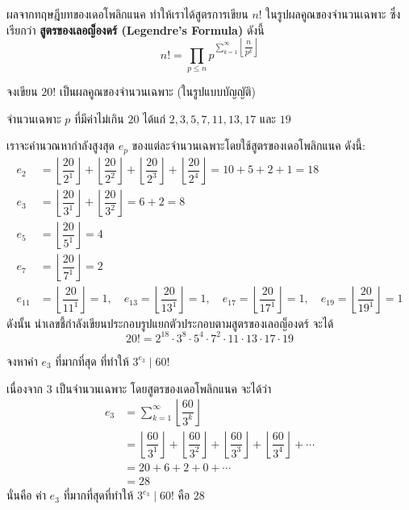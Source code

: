 \begin{remarkbox}
	ผลจากทฤษฎีบทของเดอโพลิกแนค ทำให้เราได้สูตรการเขียน $n!$ ในรูปผลคูณของจำนวนเฉพาะ ซึ่งเรียกว่า \textbf{สูตรของเลอญ็องดร์ (Legendre's Formula)} ดังนี้
\[ n! = \displaystyle\prod_{p \leq n} p^{\displaystyle\sum_{k=1}^{\infty} \left\lfloor \dfrac{n}{p^k} \right\rfloor} \]
\end{remarkbox}

\begin{examplebox}
	จงเขียน $20!$ เป็นผลคูณของจำนวนเฉพาะ (ในรูปแบบบัญญัติ) 
\end{examplebox}
	\solution จำนวนเฉพาะ $p$ ที่มีค่าไม่เกิน $20$ ได้แก่ $2, 3, 5, 7, 11, 13, 17$ และ $19$ 
	
เราจะคำนวณหากำลังสูงสุด $e_p$ ของแต่ละจำนวนเฉพาะโดยใช้สูตรของเดอโพลิกแนค ดังนี้:
\begin{align*}
	e_2 &= \left\lfloor \dfrac{20}{2^1} \right\rfloor + \left\lfloor \dfrac{20}{2^2} \right\rfloor + \left\lfloor \dfrac{20}{2^3} \right\rfloor + \left\lfloor \dfrac{20}{2^4} \right\rfloor = 10 + 5 + 2 + 1 = 18 \\
	e_3 &= \left\lfloor \dfrac{20}{3^1} \right\rfloor + \left\lfloor \dfrac{20}{3^2} \right\rfloor = 6 + 2 = 8 \\
	e_5 &= \left\lfloor \dfrac{20}{5^1} \right\rfloor = 4 \\
	e_7 &= \left\lfloor \dfrac{20}{7^1} \right\rfloor = 2 \\
	e_{11} &= \left\lfloor \dfrac{20}{11^1} \right\rfloor = 1, \quad e_{13} = \left\lfloor \dfrac{20}{13^1} \right\rfloor = 1, \quad e_{17} = \left\lfloor \dfrac{20}{17^1} \right\rfloor = 1, \quad e_{19} = \left\lfloor \dfrac{20}{19^1} \right\rfloor = 1
\end{align*}
ดังนั้น นำเลขชี้กำลังเขียนประกอบรูปแยกตัวประกอบตามสูตรของเลอญ็องดร์ จะได้
\[ 20! = 2^{18} \cdot 3^8 \cdot 5^4 \cdot 7^2 \cdot 11 \cdot 13 \cdot 17 \cdot 19 \]

\newpage
\begin{examplebox}
	จงหาค่า $e_3$ ที่มากที่สุด ที่ทำให้ $3^{e_3} \mid 60!$ 
\end{examplebox}
	\solution เนื่องจาก $3$ เป็นจำนวนเฉพาะ โดยสูตรของเดอโพลิกแนค จะได้ว่า
\begin{align*}
	e_3 &= \sum_{k=1}^{\infty} \left\lfloor \dfrac{60}{3^k} \right\rfloor \\
	&= \left\lfloor \dfrac{60}{3^1} \right\rfloor + \left\lfloor \dfrac{60}{3^2} \right\rfloor + \left\lfloor \dfrac{60}{3^3} \right\rfloor + \left\lfloor \dfrac{60}{3^4} \right\rfloor + \cdots \\
	&= 20 + 6 + 2 + 0 + \cdots \\
	&= 28
\end{align*}
นั่นคือ ค่า $e_3$ ที่มากที่สุดที่ทำให้ $3^{e_3} \mid 60!$ คือ $28$

